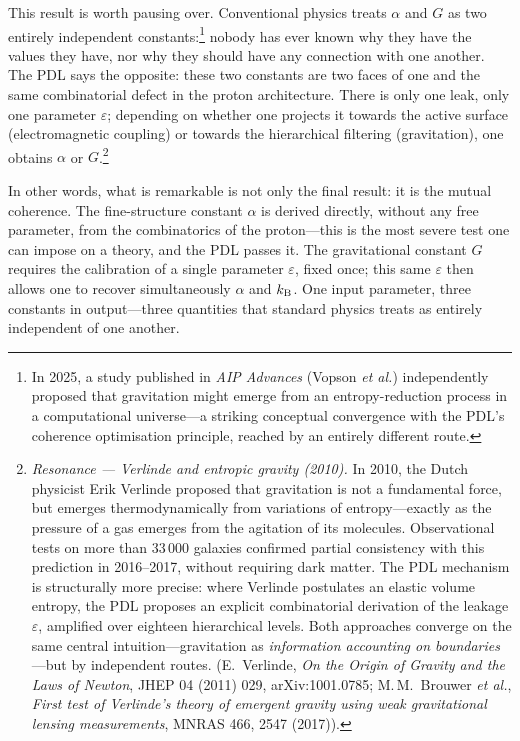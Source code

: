 \documentclass[12pt, a4paper, openright]{book}
\begin{document}
This result is worth pausing over. Conventional physics treats $\alpha$ and $G$ as two entirely independent constants:\footnote{In 2025, a study published in \textit{AIP Advances} (Vopson \textit{et al.}) independently proposed that gravitation might emerge from an entropy-reduction process in a computational universe---a striking conceptual convergence with the PDL's coherence optimisation principle, reached by an entirely different route.} nobody has ever known why they have the values they have, nor why they should have any connection with one another. The PDL says the opposite: these two constants are two faces of one and the same combinatorial defect in the proton architecture. There is only one leak, only one parameter $\varepsilon$; depending on whether one projects it towards the active surface (electromagnetic coupling) or towards the hierarchical filtering (gravitation), one obtains $\alpha$ or $G$.\footnote{\textit{Resonance --- Verlinde and entropic gravity (2010).} In 2010, the Dutch physicist Erik Verlinde proposed that gravitation is not a fundamental force, but emerges thermodynamically from variations of entropy---exactly as the pressure of a gas emerges from the agitation of its molecules. Observational tests on more than 33\,000 galaxies confirmed partial consistency with this prediction in 2016--2017, without requiring dark matter. The PDL mechanism is structurally more precise: where Verlinde postulates an elastic volume entropy, the PDL proposes an explicit combinatorial derivation of the leakage $\varepsilon$, amplified over eighteen hierarchical levels. Both approaches converge on the same central intuition---gravitation as \emph{information accounting on boundaries}---but by independent routes. (E.\ Verlinde, \textit{On the Origin of Gravity and the Laws of Newton}, JHEP 04 (2011) 029, arXiv:1001.0785; M.\,M.\ Brouwer \textit{et al.}, \textit{First test of Verlinde's theory of emergent gravity using weak gravitational lensing measurements}, MNRAS 466, 2547 (2017)).}

\medskip

In other words, what is remarkable is not only the final result: it is the mutual coherence. The fine-structure constant $\alpha$ is derived directly, without any free parameter, from the combinatorics of the proton---this is the most severe test one can impose on a theory, and the PDL passes it. The gravitational constant $G$ requires the calibration of a single parameter $\varepsilon$, fixed once; this same $\varepsilon$ then allows one to recover simultaneously $\alpha$ and $k_{\rm B}$. One input parameter, three constants in output---three quantities that standard physics treats as entirely independent of one another.
\end{document}
